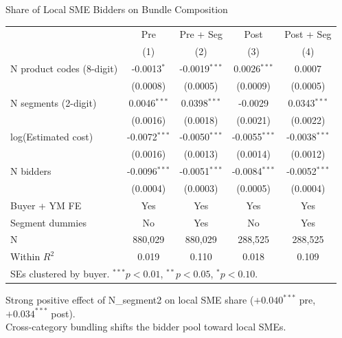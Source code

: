 \documentclass[9pt,aspectratio=169]{beamer}
\begin{document}
\begin{frame}{Share of Local SME Bidders on Bundle Composition}
\centering\small
\begin{tabular}{lcccc}
\toprule
 & Pre & Pre + Seg & Post & Post + Seg \\
 & (1) & (2) & (3) & (4) \\
\midrule
N product codes (8-digit) & -0.0013$^{*}$ & -0.0019$^{***}$ & 0.0026$^{***}$ & 0.0007 \\
 & (0.0008) & (0.0005) & (0.0009) & (0.0005) \\[2pt]
N segments (2-digit) & 0.0046$^{***}$ & 0.0398$^{***}$ & -0.0029 & 0.0343$^{***}$ \\
 & (0.0016) & (0.0018) & (0.0021) & (0.0022) \\[2pt]
log(Estimated cost) & -0.0072$^{***}$ & -0.0050$^{***}$ & -0.0055$^{***}$ & -0.0038$^{***}$ \\
 & (0.0016) & (0.0013) & (0.0014) & (0.0012) \\[2pt]
N bidders & -0.0096$^{***}$ & -0.0051$^{***}$ & -0.0084$^{***}$ & -0.0052$^{***}$ \\
 & (0.0004) & (0.0003) & (0.0005) & (0.0004) \\[2pt]
\midrule
Buyer + YM FE & Yes & Yes & Yes & Yes \\
Segment dummies & No & Yes & No & Yes \\
N & 880,029 & 880,029 & 288,525 & 288,525 \\
Within $R^2$ & 0.019 & 0.110 & 0.018 & 0.109 \\
\bottomrule
\multicolumn{5}{l}{\footnotesize SEs clustered by buyer. $^{***}p<0.01$, $^{**}p<0.05$, $^{*}p<0.10$.} \\
\end{tabular}

\medskip
\small Strong positive effect of N\_segment2 on local SME share ($+0.040^{***}$ pre, $+0.034^{***}$ post). \\
Cross-category bundling shifts the bidder pool toward local SMEs.
\end{frame}
\end{document}
